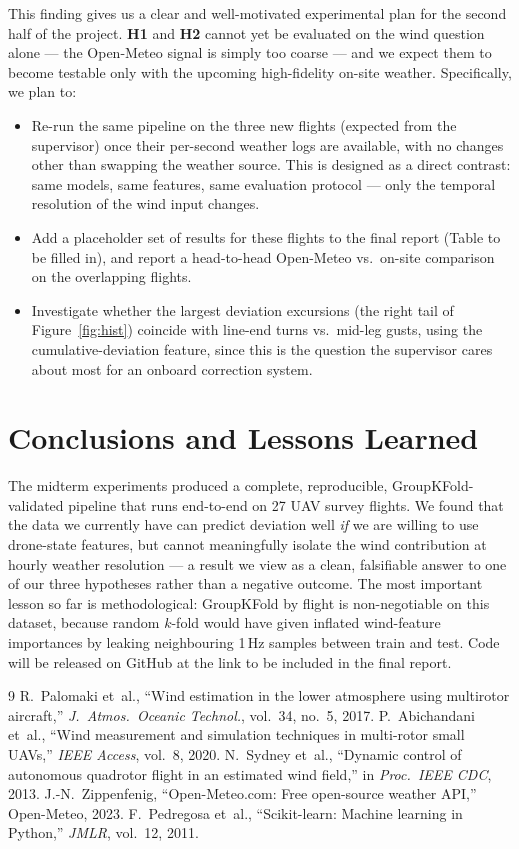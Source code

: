 \documentclass[10pt]{article}
\begin{document}
This finding gives us a clear and well-motivated experimental plan for the second half of the project. \textbf{H1} and \textbf{H2} cannot yet be evaluated on the wind question alone --- the Open-Meteo signal is simply too coarse --- and we expect them to become testable only with the upcoming high-fidelity on-site weather. Specifically, we plan to:
\begin{itemize}
  \item Re-run the same pipeline on the three new flights (expected from the supervisor) once their per-second weather logs are available, with no changes other than swapping the weather source. This is designed as a direct contrast: same models, same features, same evaluation protocol --- only the temporal resolution of the wind input changes.
  \item Add a placeholder set of results for these flights to the final report (Table to be filled in), and report a head-to-head Open-Meteo vs.\ on-site comparison on the overlapping flights.
  \item Investigate whether the largest deviation excursions (the right tail of Figure~\ref{fig:hist}) coincide with line-end turns vs.\ mid-leg gusts, using the cumulative-deviation feature, since this is the question the supervisor cares about most for an onboard correction system.
\end{itemize}

\section{Conclusions and Lessons Learned}

The midterm experiments produced a complete, reproducible, GroupKFold-validated pipeline that runs end-to-end on 27 UAV survey flights. We found that the data we currently have can predict deviation well \emph{if} we are willing to use drone-state features, but cannot meaningfully isolate the wind contribution at hourly weather resolution --- a result we view as a clean, falsifiable answer to one of our three hypotheses rather than a negative outcome. The most important lesson so far is methodological: GroupKFold by flight is non-negotiable on this dataset, because random $k$-fold would have given inflated wind-feature importances by leaking neighbouring 1\,Hz samples between train and test. Code will be released on GitHub at the link to be included in the final report.

\begin{thebibliography}{9}
\small
{} R.~Palomaki et~al., ``Wind estimation in the lower atmosphere using multirotor aircraft,'' \textit{J.\ Atmos.\ Oceanic Technol.}, vol.~34, no.~5, 2017.
 P.~Abichandani et~al., ``Wind measurement and simulation techniques in multi-rotor small UAVs,'' \textit{IEEE Access}, vol.~8, 2020.
 N.~Sydney et~al., ``Dynamic control of autonomous quadrotor flight in an estimated wind field,'' in \textit{Proc.\ IEEE CDC}, 2013.
 J.-N.~Zippenfenig, ``Open-Meteo.com: Free open-source weather API,'' Open-Meteo, 2023.
 F.~Pedregosa et~al., ``Scikit-learn: Machine learning in Python,'' \textit{JMLR}, vol.~12, 2011.
\end{thebibliography}
\end{document}
